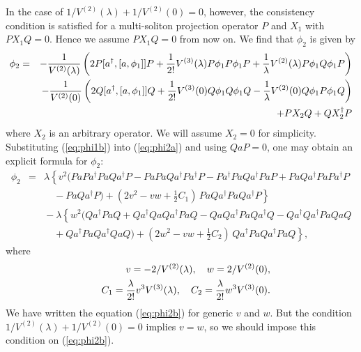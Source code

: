 \documentclass[a4paper,12pt]{article}
\begin{document}
In the case of  $1/V^{(2)}(\lambda)+1/V^{(2)}(0)=0$, however, the
consistency
condition is satisfied for a multi-soliton projection operator $P$ and
$X_{1}$
with $PX_{1}Q=0$.
Hence we assume $PX_{1}Q=0$ from now on.
We find that $\phi_{2}$ is given by
\begin{eqnarray}
 \phi_{2}&=& -{1\over V^{(2)}(\lambda)}
\left(
2P[a^{\dagger},[a,\phi_{1}]]P+{1\over2!}V^{(3)}(\lambda)P\phi_{1}P\phi_{1}P
+{1\over\lambda}V^{(2)}(\lambda)P\phi_{1}Q\phi_{1}P
\right)\nonumber\\
&&
 -{1\over V^{(2)}(0)}
\left(
2Q[a^{\dagger},[a,\phi_{1}]]Q+{1\over2!}V^{(3)}(0)Q\phi_{1}Q\phi_{1}Q
-{1\over\lambda}V^{(2)}(0)Q\phi_{1}P\phi_{1}Q
\right)\nonumber\\
&&+PX_{2}Q+QX_{2}^{\dagger}P
\label{eq:phi2a}
\end{eqnarray}
where $X_{2}$ is an arbitrary operator.
We will assume $X_2=0$ for simplicity.
Substituting (\ref{eq:phi1b}) into (\ref{eq:phi2a}) and using $QaP=0$,
one may obtain an explicit formula for $\phi_2$:
\begin{eqnarray}
 \phi_2&=&
\lambda\left\{
 v^2(P aPa^\dagger P aQa^\dagger P
 - P aP aQa^\dagger Pa^\dagger P - Pa^\dagger P aQa^\dagger P aP
 + P aQa^\dagger P aPa^\dagger P \right.\nonumber\\
&&{} \left.\quad - P aQa^\dagger P)
 +\left(2v^2-vw+\frac12 C_1
 \right)\,
 P aQa^\dagger P aQa^\dagger P\right\}\nonumber\\
&&{}-\lambda\left\{
 w^2(Qa^\dagger P aQ + Qa^\dagger Q aQa^\dagger P aQ
 - Q aQa^\dagger P aQa^\dagger Q
 - Qa^\dagger Qa^\dagger P aQ aQ \right.\nonumber\\
&&{} \left. \quad + Qa^\dagger P aQa^\dagger Q aQ)
 +\left(2w^2-vw+\frac12 C_2
 \right)\,
 Qa^\dagger P aQa^\dagger P aQ \right\},
\label{eq:phi2b}
\end{eqnarray}
where
\begin{eqnarray}
&&
v=-2/V^{(2)}(\lambda), \quad
w=2/V^{(2)}(0),
\label{eq:coeff1}\\
&&
C_{1}={\lambda\over 2!}v^3V^{(3)}(\lambda),\quad
C_{2}={\lambda\over 2!}w^3 V^{(3)}(0).
\label{eq:coeff2}
\end{eqnarray}
We have written the equation (\ref{eq:phi2b}) for generic $v$ and $w$.
But the condition $1/V^{(2)}(\lambda)+1/V^{(2)}(0)=0$ implies $v=w$,
so we should impose this condition on (\ref{eq:phi2b}).
\end{document}
